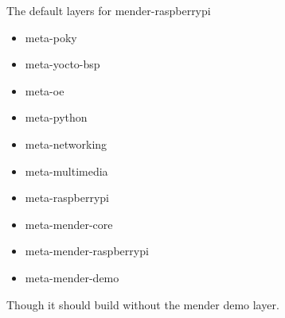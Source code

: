 \documentclass[../../main.tex]{subfiles}
\begin{document}
The default layers for mender-raspberrypi
\begin{itemize}
	\item meta-poky
	\item meta-yocto-bsp
	\item meta-oe
	\item meta-python
	\item meta-networking
	\item meta-multimedia
	\item meta-raspberrypi
	\item meta-mender-core
	\item meta-mender-raspberrypi
	\item meta-mender-demo
\end{itemize}
Though it should build without the mender demo layer.


\end{document}
